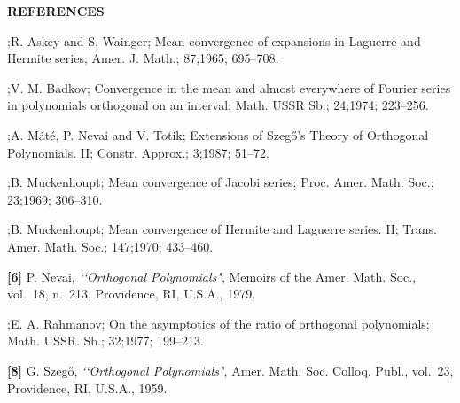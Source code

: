 \centerline {\bf REFERENCES}

\bigskip

\frenchspacing

;R. Askey and S. Wainger; Mean convergence of expansions in Laguerre and
Hermite series; Amer. J. Math.; 87;1965; 695--708.

;V. M. Badkov; Convergence in the mean and almost everywhere of Fourier
series in polynomials orthogonal on an interval; Math. USSR Sb.; 24;1974;
223--256.

;A. M\'at\'e, P. Nevai and V. Totik; Extensions of Szeg\H o's
Theory of Orthogonal Polynomials. II; Constr. Approx.; 3;1987; 51--72.

;B. Muckenhoupt; Mean convergence of Jacobi series; Proc. Amer. Math.
Soc.; 23;1969; 306--310.

;B. Muckenhoupt; Mean convergence of Hermite and Laguerre series. II;
Trans. Amer. Math. Soc.; 147;1970; 433--460.

\item {\bf [6]} {\rm P. Nevai, {\it \lq \lq Orthogonal Polynomials"}, Memoirs of
the Amer. Math. Soc., vol.~18, n.~213, Providence, RI, U.S.A., 1979.}

;E. A. Rahmanov; On the asymptotics of the ratio of orthogonal
polynomials; Math. USSR. Sb.; 32;1977; 199--213.

\item {\bf [8]} {\rm G. Szeg\H o, {\it \lq \lq Orthogonal Polynomials"}, Amer.
Math. Soc. Colloq. Publ., vol.~23, Providence, RI, U.S.A., 1959.}

\bye
